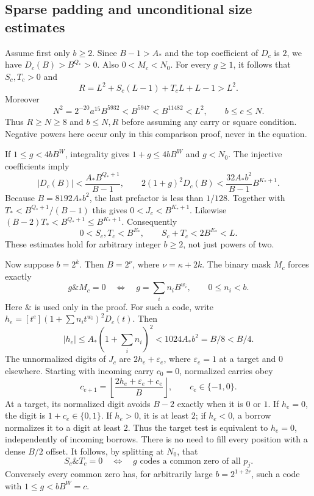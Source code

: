 \subsection{Sparse padding and unconditional size estimates}
Assume first only $b\ge2$. Since $B-1>A_*$ and the top coefficient of $D_c$
is $2$, we have $D_c(B)>B^{Q_*}>0$. Also $0<M_c<N_0$.
For every $g\ge1$, it follows that $S_c,T_c>0$ and
\[
 R=L^2+S_c(L-1)+T_cL+L-1>L^2.
\]
Moreover
\[
 N^2=2^{-20}a^{15}B^{5932}<B^{5947}<B^{11482}<L^2,
 \qquad b\le c\le N.
\]
Thus $R\ge N\ge8$ and $b\le N,R$ before assuming any carry or square
condition. Negative powers here occur only in this comparison proof, never
in the equation.

If $1\le g<4bB^W$, integrality gives $1+g\le4bB^W$ and $g<N_0$.
The injective coefficients imply
\[
 |D_c(B)|<\frac{A_*B^{Q_*+1}}{B-1},\qquad
 2(1+g)^2D_c(B)<\frac{32A_*b^2}{B-1}B^{K_*+1}.
\]
Because $B=8192A_*b^2$, the last prefactor is less than $1/128$.
Together with $T_*<B^{Q_*+1}/(B-1)$ this gives
$0<J_c<B^{K_*+1}$. Likewise $(B-2)T_*<B^{Q_*+1}\le B^{K_*+1}$.
Consequently
\[
 0<S_c,T_c<B^{E_*},\qquad S_c+T_c<2B^{E_*}<L.
\]
These estimates hold for arbitrary integer $b\ge2$, not just powers of two.

Now suppose $b=2^k$. Then $B=2^\nu$, where $\nu=\kappa+2k$.
The binary mask $M_c$ forces exactly
\[
 g\mathbin{\&}M_c=0\quad\Longleftrightarrow\quad
 g=\sum_i n_iB^{w_i},\qquad 0\le n_i<b.
\]
Here $\&$ is used only in the proof. For such a code, write
$h_e=[t^e](1+\sum n_it^{w_i})^2D_c(t)$. Then
\[
 |h_e|\le A_*(1+\textstyle\sum_i n_i)^2
 <1024A_*b^2=B/8<B/4.
\]
The unnormalized digits of $J_c$ are $2h_e+\varepsilon_e$, where
$\varepsilon_e=1$ at a target and $0$ elsewhere. Starting with incoming
carry $c_0=0$, normalized carries obey
\[
 c_{e+1}=\left\lfloor\frac{2h_e+\varepsilon_e+c_e}{B}\right\rfloor,
 \qquad c_e\in\{-1,0\}.
\]
At a target, its normalized digit avoids $B-2$ exactly when it is $0$ or $1$.
If $h_e=0$, the digit is $1+c_e\in\{0,1\}$. If $h_e>0$, it is at least $2$;
if $h_e<0$, a borrow normalizes it to a digit at least $2$.
Thus the target test is equivalent to $h_e=0$, independently of incoming
borrows. There is no need to fill every position with a dense $B/2$ offset.
It follows, by splitting at $N_0$, that
\[
 S_c\mathbin{\&}T_c=0\quad\Longleftrightarrow\quad
 g\text{ codes a common zero of all }p_j.
\]
Conversely every common zero has, for arbitrarily large $b=2^{1+2r}$, such a
code with $1\le g<bB^W=c$.


